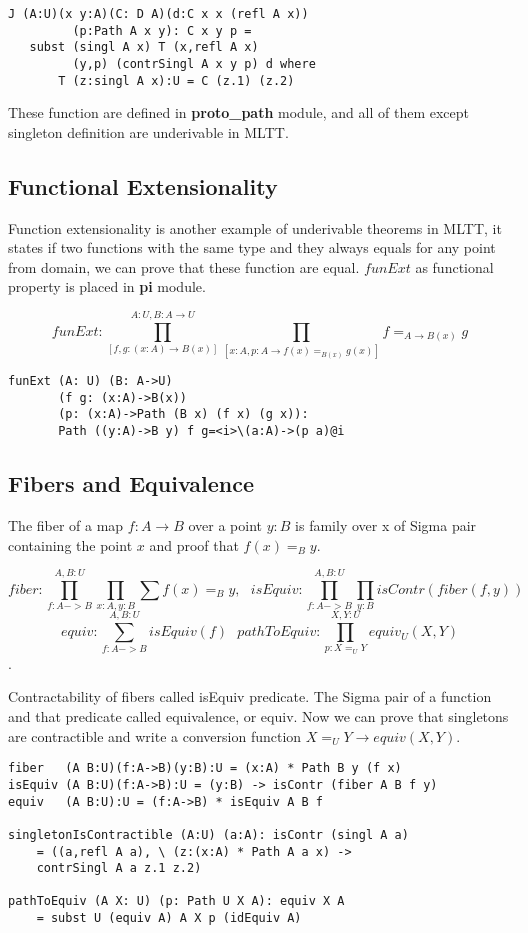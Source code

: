 \documentclass{article}
\begin{document}
\begin{lstlisting}[mathescape=true]
J (A:U)(x y:A)(C: D A)(d:C x x (refl A x))
         (p:Path A x y): C x y p =
   subst (singl A x) T (x,refl A x)
         (y,p) (contrSingl A x y p) d where
       T (z:singl A x):U = C (z.1) (z.2)
\end{lstlisting}

These function are defined in {\bf proto\_path} module, and all of them
except singleton definition are underivable in MLTT.

\subsection{Functional Extensionality}

Function extensionality is another example of underivable theorems in MLTT, it
states if two functions with the same type and they always equals for
any point from domain, we can prove that these function are equal.
$funExt$ as functional property is placed in {\bf pi} module.

$$funExt: \prod_{[f,g: (x:A) \rightarrow B(x)]}^{A: U,B:A\rightarrow U}\prod_{[x:A,p:A\rightarrow f(x) =_{B(x)} g(x)]} f =_{A\rightarrow B(x)} g$$

\begin{lstlisting}[mathescape=true]
funExt (A: U) (B: A->U)
       (f g: (x:A)->B(x))
       (p: (x:A)->Path (B x) (f x) (g x)):
       Path ((y:A)->B y) f g=<i>\(a:A)->(p a)@i
\end{lstlisting}

\subsection{Fibers and Equivalence}

The fiber of a map $f : A \rightarrow B$ over a point $y : B$ is family over x
of Sigma pair containing the point $x$ and proof that $f(x)=_B y$.

$$fiber : \prod_{f:A->B}^{A,B:U}\prod_{x:A,y:B}\sum f(x) =_B y,\ \ \ 
  isEquiv : \prod_{f:A->B}^{A,B:U}\prod_{y:B} isContr(fiber(f,y))$$
$$equiv : \sum_{f:A->B}^{A,B:U} isEquiv(f) \ \ \ 
  pathToEquiv: \prod_{p: X =_U Y}^{X,Y:U} equiv_U(X,Y)$$.

Contractability of fibers called isEquiv predicate. The Sigma pair of
a function and that predicate called equivalence, or equiv. Now we
can prove that singletons are contractible and write a conversion
function $X=_U Y \rightarrow equiv(X,Y)$.

\begin{lstlisting}[mathescape=true]
fiber   (A B:U)(f:A->B)(y:B):U = (x:A) * Path B y (f x)
isEquiv (A B:U)(f:A->B):U = (y:B) -> isContr (fiber A B f y)
equiv   (A B:U):U = (f:A->B) * isEquiv A B f

singletonIsContractible (A:U) (a:A): isContr (singl A a)
    = ((a,refl A a), \ (z:(x:A) * Path A a x) ->
    contrSingl A a z.1 z.2)

pathToEquiv (A X: U) (p: Path U X A): equiv X A
    = subst U (equiv A) A X p (idEquiv A)
\end{lstlisting}
\end{document}
